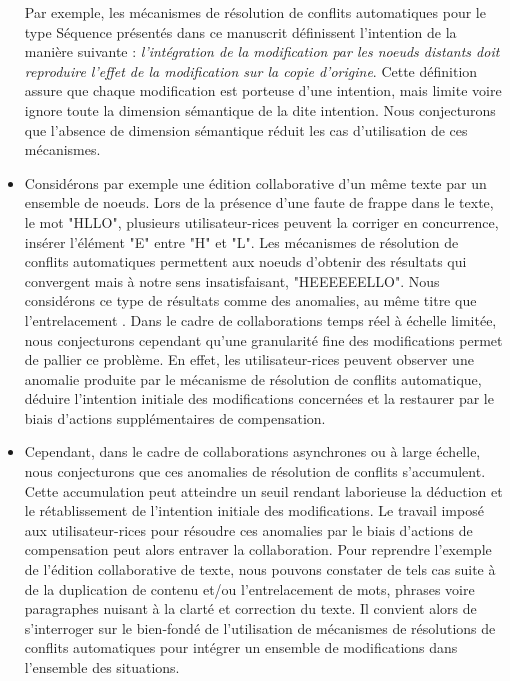\begin{itemize}
        Par exemple, les mécanismes de résolution de conflits automatiques pour le type Séquence présentés dans ce manuscrit  définissent l'intention de la manière suivante : \emph{l'intégration de la modification par les noeuds distants doit reproduire l'effet de la modification sur la copie d'origine}.
        Cette définition assure que chaque modification est porteuse d'une intention, mais limite voire ignore toute la dimension sémantique de la dite intention.
        Nous conjecturons que l'absence de dimension sémantique réduit les cas d'utilisation de ces mécanismes.
    \item Considérons par exemple une édition collaborative d'un même texte par un ensemble de noeuds.
        Lors de la présence d'une faute de frappe dans le texte, \eg le mot "HLLO", plusieurs utilisateur-rices peuvent la corriger en concurrence, \ie insérer l'élément "E" entre "H" et "L".
        Les mécanismes de résolution de conflits automatiques permettent aux noeuds d'obtenir des résultats qui convergent mais à notre sens insatisfaisant, \eg "HEEEEEELLO".
        Nous considérons ce type de résultats comme des anomalies, au même titre que l'entrelacement \cite{2019-interleaving-anomalies-collaborative-editors-kleppmann}.
        Dans le cadre de collaborations temps réel à échelle limitée, nous conjecturons cependant qu'une granularité fine des modifications permet de pallier ce problème.
        En effet, les utilisateur-rices peuvent observer une anomalie produite par le mécanisme de résolution de conflits automatique, déduire l'intention initiale des modifications concernées et la restaurer par le biais d'actions supplémentaires de compensation.
    \item Cependant, dans le cadre de collaborations asynchrones ou à large échelle, nous conjecturons que ces anomalies de résolution de conflits s'accumulent.
        Cette accumulation peut atteindre un seuil rendant laborieuse la déduction et le rétablissement de l'intention initiale des modifications.
        Le travail imposé aux utilisateur-rices pour résoudre ces anomalies par le biais d'actions de compensation peut alors entraver la collaboration.
        Pour reprendre l'exemple de l'édition collaborative de texte, nous pouvons constater de tels cas suite à de la duplication de contenu et/ou l'entrelacement de mots, phrases voire paragraphes nuisant à la clarté et correction du texte.
        Il convient alors de s'interroger sur le bien-fondé de l'utilisation de mécanismes de résolutions de conflits automatiques pour intégrer un ensemble de modifications dans l'ensemble des situations.

\end{itemize}
